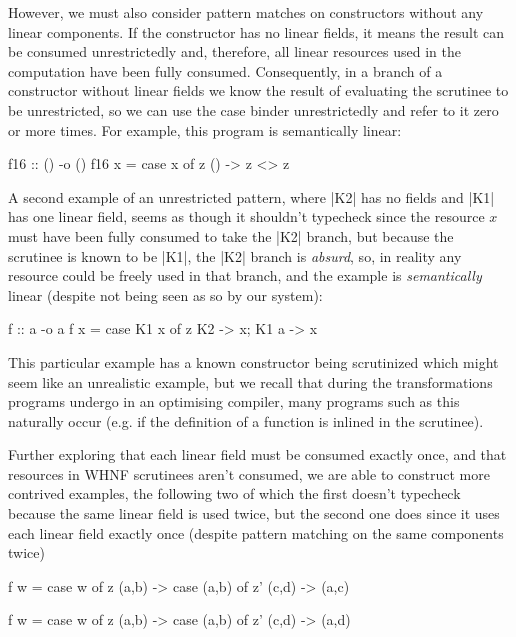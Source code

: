 \documentclass[acmsmall, screen, review]{acmart}
\begin{document}
However, we must also consider pattern matches on constructors without
any linear components. If the constructor has no linear fields, it means the
result can be consumed unrestrictedly and, therefore, all linear resources used
in the computation have been fully consumed.
%
Consequently, in a branch of a constructor without linear fields we know the
result of evaluating the scrutinee to be unrestricted, so we can use the case
binder unrestrictedly and refer to it zero or more times. For example, this
program is semantically linear:
\begin{notyet}
\begin{code}
f16 :: () -o ()
f16 x = case x of z { () -> z <> z }
\end{code}
\end{notyet}
A second example of an unrestricted pattern, where |K2| has no fields and |K1|
has one linear field, seems as though it shouldn't typecheck since the resource
$x$ must have been fully consumed to take the |K2| branch, but because the
scrutinee is known to be |K1|, the |K2| branch is \emph{absurd}, so, in reality
any resource could be freely used in that branch, and the example is
\emph{semantically} linear (despite not being seen as so by our system):
%
\begin{limitation}
\begin{code}
f :: a -o a
f x = case K1 x of z { K2 -> x; K1 a -> x }
\end{code}
\end{limitation}
%
This particular example has a known constructor being scrutinized which might
seem like an unrealistic example, but we recall that during the transformations
programs undergo in an optimising compiler, many programs such as this
naturally occur (e.g. if the definition of a function is inlined in the
scrutinee).
%

Further exploring that each linear field must be consumed exactly once, and
that resources in WHNF scrutinees aren't consumed, we are able to construct
more contrived examples, the following two of which the first doesn't typecheck
because the same linear field is used twice, but the second one does since it
uses each linear field exactly once (despite pattern matching on the same
components twice)
\begin{noway}
\begin{code}
f w = case w of z
        (a,b) ->
          case (a,b) of z'
            (c,d) ->
               (a,c)
\end{code}
\end{noway}
\begin{notyet}
\begin{code}
f w = case w of z
        (a,b) ->
          case (a,b) of z'
            (c,d) ->
               (a,d)
\end{code}
\end{notyet}
\end{document}
